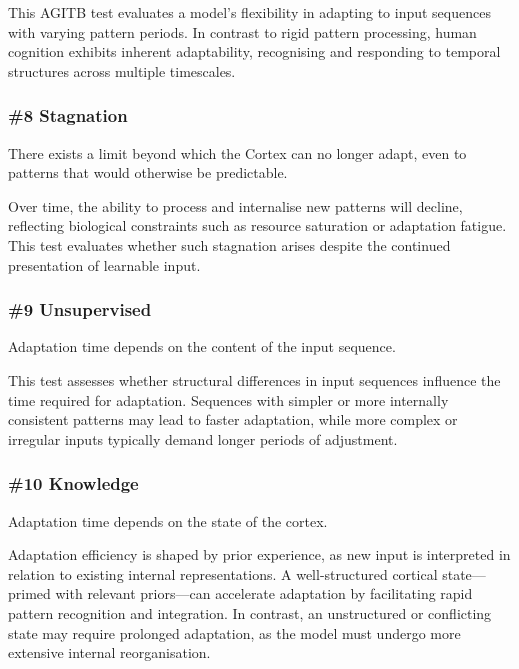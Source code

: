 \documentclass{article}
\newenvironment{one_assertion}[1]
{
  \begin{tabular}{p{1.5cm}p{8.2cm}}
    \textbf{Assertion:} & #1 \\
}{
  \end{tabular}\\
}
\begin{document}
This AGITB test evaluates a model’s flexibility in adapting to input sequences with varying pattern periods. In contrast to rigid pattern processing, human cognition exhibits inherent adaptability, recognising and responding to temporal structures across multiple timescales.

\subsubsection*{\#8 Stagnation}
\begin{one_assertion}
    {There exists a limit beyond which the Cortex can no longer adapt, even to patterns that would otherwise be predictable.}
\end{one_assertion}

Over time, the ability to process and internalise new patterns will decline, reflecting biological constraints such as resource saturation or adaptation fatigue. This test evaluates whether such stagnation arises despite the continued presentation of learnable input.

\subsubsection*{\#9 Unsupervised}
\begin{one_assertion}
    {Adaptation time depends on the content of the input sequence.}
\end{one_assertion}

This test assesses whether structural differences in input sequences influence the time required for adaptation. Sequences with simpler or more internally consistent patterns may lead to faster adaptation, while more complex or irregular inputs typically demand longer periods of adjustment.

\subsubsection*{\#10 Knowledge}
\begin{one_assertion}
{Adaptation time depends on the state of the cortex.}
\end{one_assertion}

Adaptation efficiency is shaped by prior experience, as new input is interpreted in relation to existing internal representations. A well-structured cortical state—primed with relevant priors—can accelerate adaptation by facilitating rapid pattern recognition and integration. In contrast, an unstructured or conflicting state may require prolonged adaptation, as the model must undergo more extensive internal reorganisation.
\end{document}
